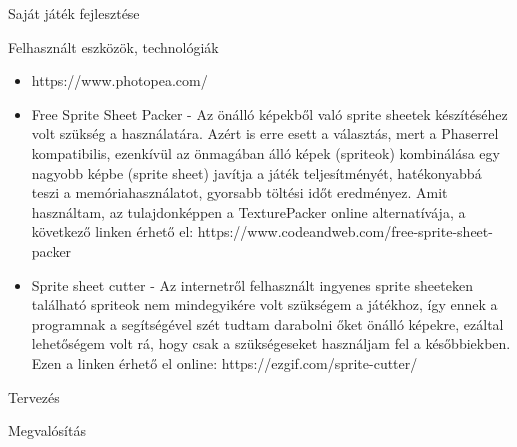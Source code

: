 \begin{MyChapter}{Saját játék fejlesztése}
\begin{MySection}{Felhasznált eszközök, technológiák}
\begin{itemize}
			\item  https://www.photopea.com/ %
			\item Free Sprite Sheet Packer - Az önálló képekből való sprite sheetek készítéséhez volt szükség a használatára. Azért is erre esett a választás, mert a Phaserrel kompatibilis, ezenkívül az önmagában álló képek (spriteok) kombinálása egy nagyobb képbe (sprite sheet) javítja a játék teljesítményét, hatékonyabbá teszi a memóriahasználatot, gyorsabb töltési időt eredményez. %
			Amit használtam, az tulajdonképpen a TexturePacker online alternatívája, a következő linken érhető el: https://www.codeandweb.com/free-sprite-sheet-packer
			\item Sprite sheet cutter - Az internetről felhasznált ingyenes sprite sheeteken található spriteok nem mindegyikére volt szükségem a játékhoz, így ennek a programnak %
			a segítségével szét tudtam darabolni őket önálló képekre, ezáltal lehetőségem volt rá, hogy csak a szükségeseket használjam fel a későbbiekben. Ezen a linken érhető el online: https://ezgif.com/sprite-cutter/ %
		\end{itemize}
	\end{MySection}
		
	\begin{MySection}{Tervezés}
	\end{MySection}
		
	\begin{MySection}{Megvalósítás}
	\end{MySection}
		

\end{MyChapter}

